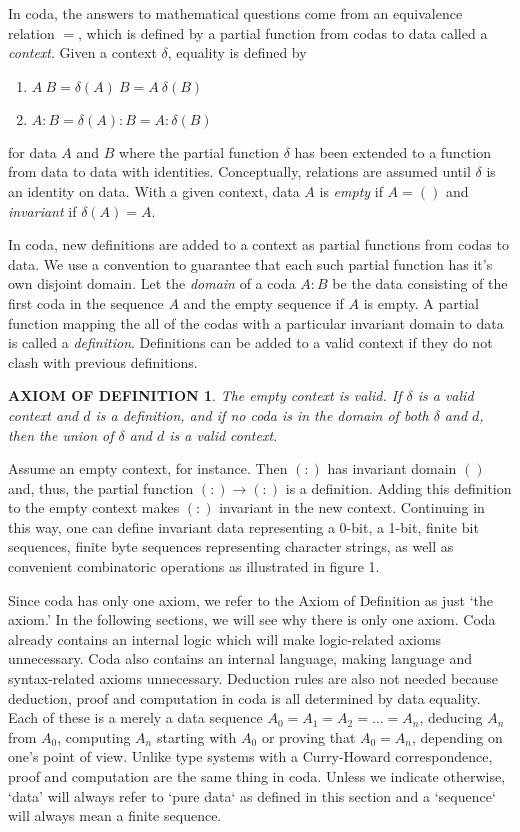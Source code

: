 \documentclass[11pt]{article}
\begin{document}
     In coda, the answers to mathematical questions come from an equivalence relation $=$, which is defined by a partial function from codas to data
called a {\it context}.  Given a context $\delta$, equality is defined by
\begin{enumerate}
\item[] $A\ B = \delta(A)\ B = A\ \delta(B)$
\item[] $A:B = \delta(A):B = A:\delta(B)$
\end{enumerate}
for data $A$ and $B$ where the partial function $\delta$ has been extended to a function from data to data with identities.
Conceptually, relations are assumed until $\delta$ is an identity on data.  With a given context, data $A$ is {\it empty} if $A=()$ and {\it invariant}
if $\delta(A)=A$.

     In coda, new definitions are added to a context as partial functions from codas to data.  We use a convention to guarantee that each such partial
function has it's own disjoint domain.  Let the {\it domain} of a coda $A:B$ be the data consisting of the first coda in the sequence $A$ and the empty
sequence if $A$ is empty.  A partial function mapping the all of the codas with a particular invariant domain to data is called a {\it definition}.  Definitions
can be added to a valid context if they do not clash with previous definitions.

\newtheorem*{remark}{AXIOM OF DEFINITION}
\begin{remark}  The empty context is valid.  If $\delta$ is a valid context and $d$ is a definition, and if no coda is in
the domain of both $\delta$ and $d$, then the union of $\delta$ and $d$ is a valid context.
\end{remark}

\noindent Assume an empty context, for instance.  Then $(:)$ has invariant domain $()$ and, thus, the partial function $(:)\rightarrow (:)$ is a definition.
Adding this definition to the empty context makes $(:)$ invariant in the new context.  Continuing in this way, one can define invariant data
representing a 0-bit, a 1-bit, finite bit sequences, finite byte sequences representing character strings, as well as convenient combinatoric operations as
illustrated in figure 1.

    Since coda has only one axiom, we refer to the Axiom of Definition as just `the axiom.'  In the following sections, we will see why there is only
one axiom.  Coda already contains an internal logic which will make logic-related axioms unnecessary.  Coda also contains an internal language, making
language and syntax-related axioms unnecessary.  Deduction rules are also not needed because deduction, proof and computation in coda is all determined
by data equality.  Each of these is a merely a data sequence $A_0=A_1=A_2=\dots=A_n$, deducing $A_n$ from $A_0$, computing
$A_n$ starting with $A_0$ or proving that $A_0=A_n$, depending on one's point of view.  Unlike type systems with a Curry-Howard correspondence, proof and computation are the same thing in coda.  Unless we indicate otherwise, `data' will always refer to `pure data` as defined in this section and
a `sequence` will always mean a finite sequence.
\end{document}
